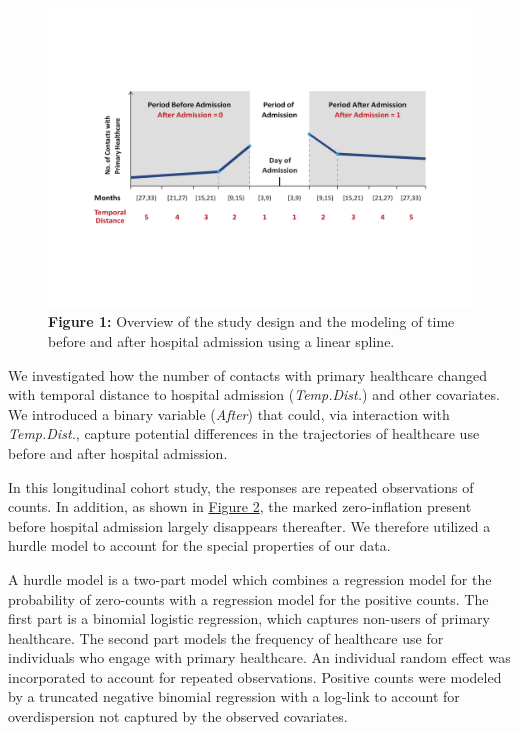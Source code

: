 	\begin{figure}[H]
		\centering
		\includegraphics[scale=0.55]{Paper_2/MAIN_Figure_1.pdf}
		\caption*{\textbf{Figure 1:} 	Overview of the study design and the modeling 
										of time before and after hospital admission using 
										a linear spline.}
	\label{ch3:fig1}
	\end{figure}

We investigated how the number of contacts with primary healthcare changed 
with temporal distance to hospital admission (\textit{Temp.Dist.}) and other 
covariates. We introduced a binary variable (\textit{After}) that could, via 
interaction with \textit{Temp.Dist.}, capture potential differences in the 
trajectories of healthcare use before and after hospital admission.

In this longitudinal cohort study, the responses are repeated observations 
of counts. In addition, as shown in \hyperref[ch3:fig2]{Figure 2}, the marked zero-inflation 
present before hospital admission largely disappears thereafter. We therefore 
utilized a hurdle model to account for the special properties of our data.\citep{min2005random}

A hurdle model is a two-part model which combines a regression model for the 
probability of zero-counts with a regression model for the positive counts. The 
first part is a binomial logistic regression, which captures non-users of primary 
healthcare. The second part models the frequency of healthcare use for individuals 
who engage with primary healthcare. An individual random effect was incorporated 
to account for repeated observations. Positive counts were modeled by a truncated 
negative binomial regression with a log-link to account for overdispersion not 
captured by the observed covariates.\\

